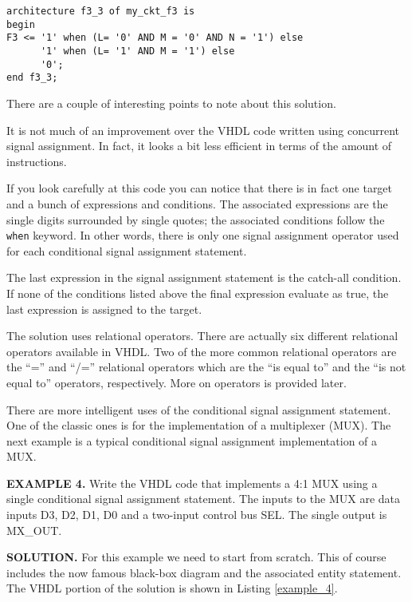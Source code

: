 \begin{lstlisting}[label=example_3, caption=Solution of example 3.]
architecture f3_3 of my_ckt_f3 is
begin
F3 <= '1' when (L= '0' AND M = '0' AND N = '1') else
      '1' when (L= '1' AND M = '1') else
      '0';
end f3_3;
\end{lstlisting}
There are a couple of interesting points to note about this solution.
\begin{my_list}
\item It is not much of an improvement over the VHDL code written using concurrent signal assignment. In fact, it looks a bit less efficient in terms of the amount of instructions.
\item If you look carefully at this code you can notice that there is in fact one target and a bunch of expressions and conditions. The associated expressions are the single digits surrounded by single quotes; the associated conditions follow the \texttt{when} keyword. In other words, there is only one signal assignment operator used for each conditional signal assignment statement.
\item The last expression in the signal assignment statement is the catch-all condition. If none of the conditions listed above the final expression evaluate as true, the last expression is assigned to the target.
\item The solution uses relational operators. There are actually six different relational operators available in VHDL. Two of the more common relational operators are the ``='' and ``/='' relational operators which are the ``is equal to'' and the ``is not equal to'' operators, respectively. More on operators is provided later.
\end{my_list}
There are more intelligent uses of the conditional signal assignment statement. One of the classic ones is for the implementation of a multiplexer (MUX). The next example is a typical conditional signal assignment implementation of a MUX.

\begin{leftbar}
\noindent
\textbf{EXAMPLE 4.}
Write the VHDL code that implements a 4:1 MUX using a single conditional signal assignment statement. The inputs to the MUX are data inputs D3, D2, D1, D0 and a two-input control bus SEL. The single output is MX\_OUT.
\end{leftbar}
\noindent
\textbf{SOLUTION.} For this example we need to start from scratch. This of course includes the now famous black-box diagram and the associated entity statement. The VHDL portion of the solution is shown in Listing \ref{example_4}.

